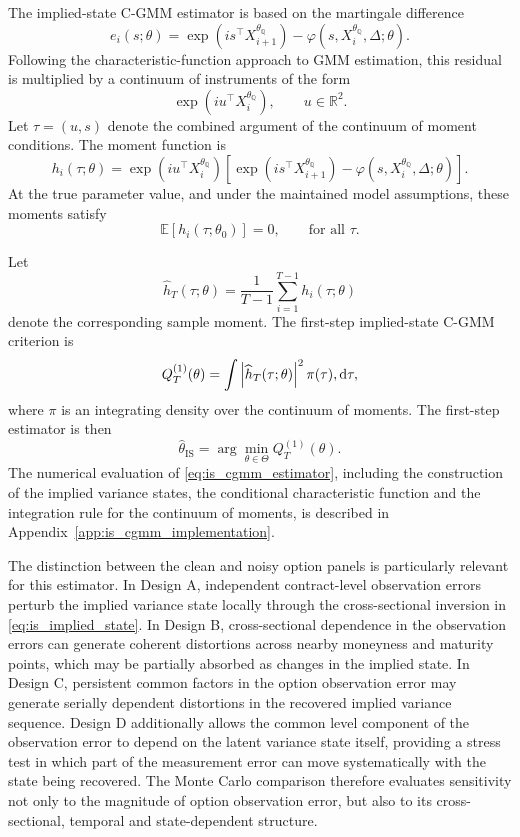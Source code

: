 \documentclass[11pt,a4paper,notitlepage]{article}
\numberwithin{equation}{section}
\begin{document}
The implied-state C-GMM estimator is based on the martingale difference
\[
e_i(s;\theta)
=
\exp\left(
is^\top X_{i+1}^{\theta_{\mathbb Q}}
\right)
-
\varphi\left(s,X_i^{\theta_{\mathbb Q}},\Delta;\theta\right).
\label{eq:is_cgmm_error}
\]
Following the characteristic-function approach to GMM estimation, this residual is multiplied by a continuum of instruments of the form
\[
\exp\left(
iu^\top X_i^{\theta_{\mathbb Q}}
\right),
\qquad u\in\mathbb R^2 .
\]
Let \(\tau=(u,s)\) denote the combined argument of the continuum of moment conditions. The moment function is
\[
h_i(\tau;\theta)
=
\exp\left(
iu^\top X_i^{\theta_{\mathbb Q}}
\right)
\left[
\exp\left(
is^\top X_{i+1}^{\theta_{\mathbb Q}}
\right)
-
\varphi\left(s,X_i^{\theta_{\mathbb Q}},\Delta;\theta\right)
\right].
\label{eq:is_cgmm_moment}
\]
At the true parameter value, and under the maintained model assumptions, these moments satisfy
\[
\mathbb E\left[
h_i(\tau;\theta_0)
\right]
=
0,
\qquad
\text{for all } \tau .
\]

Let
\[
\widehat h_T(\tau;\theta)
=
\frac{1}{T-1}
\sum_{i=1}^{T-1}
h_i(\tau;\theta)
\]
denote the corresponding sample moment. The first-step implied-state C-GMM criterion is
\[
Q_T^{(1)}(\theta)
=
\int
\left|
\widehat h_T(\tau;\theta)
\right|^2
\pi(\tau),\dif\tau ,
\label{eq:is_cgmm_first_step_criterion}
\]
where \(\pi\) is an integrating density over the continuum of moments. The first-step estimator is then
\begin{equation}
\widehat\theta_{\mathrm{IS}}
=
\arg\min_{\theta\in\Theta}
Q_T^{(1)}(\theta).
\label{eq:is_cgmm_estimator}
\end{equation}
The numerical evaluation of \eqref{eq:is_cgmm_estimator}, including the construction of the implied variance states, the conditional characteristic function and the integration rule for the continuum of moments, is described in Appendix~\ref{app:is_cgmm_implementation}.

The distinction between the clean and noisy option panels is particularly relevant for this estimator. In Design A, independent contract-level observation errors perturb the implied variance state locally through the cross-sectional inversion in \eqref{eq:is_implied_state}. In Design B, cross-sectional dependence in the observation errors can generate coherent distortions across nearby moneyness and maturity points, which may be partially absorbed as changes in the implied state. In Design C, persistent common factors in the option observation error may generate serially dependent distortions in the recovered implied variance sequence. Design D additionally allows the common level component of the observation error to depend on the latent variance state itself, providing a stress test in which part of the measurement error can move systematically with the state being recovered. The Monte Carlo comparison therefore evaluates sensitivity not only to the magnitude of option observation error, but also to its cross-sectional, temporal and state-dependent structure.
\end{document}
